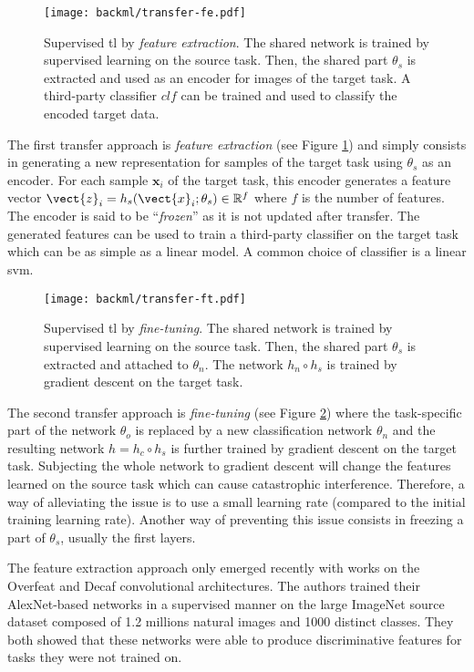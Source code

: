 \begin{figure}
  \centering
  \texttt{[image: backml/transfer-fe.pdf]}
  \caption{Supervised \acrlong{tl} by \textit{feature extraction}. The shared network is trained by supervised learning on the source task. Then, the shared part $\theta_s$ is extracted and used as an encoder for images of the target task. A third-party classifier $clf$ can be trained and used to classify the encoded target data.}
  \label{fig:backml:transfer-fe}
\end{figure}

The first transfer approach is \textit{feature extraction} (see Figure
\ref{fig:backml:transfer-fe}) and simply consists in generating a new representation
for samples of the target task using $\theta_s$ as an encoder. For each sample
$\mathbf{x}_i$ of the target task, this encoder generates a feature vector
$\vect{z}_i = h_s(\vect{x}_i;\theta_s) \in \mathbb{R}^f$ where $f$ is the number
of features. The encoder is said to be ``\textit{frozen}'' as it is not updated
after transfer. The generated features can be used to train a third-party classifier
on the target task which can be as simple as a linear model. A common choice of
classifier is a linear \acrshort{svm}.

\begin{figure}
  \centering
  \texttt{[image: backml/transfer-ft.pdf]}
  \caption{Supervised \acrlong{tl} by \textit{fine-tuning}. The shared network is trained by supervised learning on the source task. Then, the shared part $\theta_s$ is extracted and attached to $\theta_n$. The network $h_n \circ h_s$ is trained by gradient descent on the target task.}
  \label{fig:backml:transfer-ft}
\end{figure}

The second transfer approach is \textit{fine-tuning} (see Figure \ref{fig:backml:transfer-ft})
where the task-specific part of the network $\theta_{o}$ is replaced by a new
classification network $\theta_{n}$ and the resulting network $h = h_c \circ h_s$
is further trained by gradient descent on the target task. Subjecting the whole
network to gradient descent will change the features learned on the source task
which can cause catastrophic interference. Therefore, a way of alleviating the
issue is to use a small learning rate (compared to the initial training learning
rate). Another way of preventing this issue consists in freezing a part of
$\theta_s$, usually the first layers.

The feature extraction approach only emerged recently with works on the Overfeat
\cite{sermanet2013overfeat, razavian2014cnn} and Decaf \cite{donahue2014decaf}
convolutional architectures. The authors trained their AlexNet-based networks in
a supervised manner on the large ImageNet source dataset composed of 1.2 millions
natural images and 1000 distinct classes. They both showed that these networks
were able to produce discriminative features for tasks they were not trained on.


